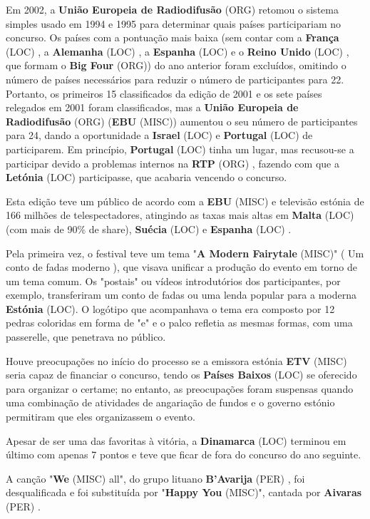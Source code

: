 \documentclass[12pt,a4paper]{article}
\begin{document}
Em 2002, a \textbf{União Europeia de Radiodifusão} (ORG) retomou o sistema simples usado em 1994 e 1995 para determinar quais países participariam no concurso. Os países com a pontuação mais baixa (sem contar com a \textbf{França} (LOC) , a \textbf{Alemanha} (LOC) , a \textbf{Espanha} (LOC) e o \textbf{Reino Unido} (LOC) , que formam o \textbf{Big Four} (ORG)) do ano anterior foram excluídos, omitindo o número de países necessários para reduzir o número de participantes para 22. Portanto, os primeiros 15 classificados da edição de 2001 e os sete países relegados em 2001 foram classificados, mas a \textbf{União Europeia de Radiodifusão} (ORG) (\textbf{EBU} (MISC)) aumentou o seu número de participantes para 24, dando a oportunidade a \textbf{Israel} (LOC) e \textbf{Portugal} (LOC) de participarem. Em princípio, \textbf{Portugal} (LOC) tinha um lugar, mas recusou-se a participar devido a problemas internos na \textbf{RTP} (ORG) , fazendo com que a \textbf{Letónia} (LOC) participasse, que acabaria vencendo o concurso.

Esta edição teve um público de acordo com a \textbf{EBU} (MISC) e televisão estónia de 166 milhões de telespectadores, atingindo as taxas mais altas em \textbf{Malta} (LOC) (com mais de 90\% de share), \textbf{Suécia} (LOC) e \textbf{Espanha} (LOC) .

Pela primeira vez, o festival teve um tema "\textbf{A Modern Fairytale} (MISC)" ( Um conto de fadas moderno ), que visava unificar a produção do evento em torno de um tema comum. Os "postais" ou vídeos introdutórios dos participantes, por exemplo, transferiram um conto de fadas ou uma lenda popular para a moderna \textbf{Estónia} (LOC). O logótipo que acompanhava o tema era composto por 12 pedras coloridas em forma de "e" e o palco refletia as mesmas formas, com uma passerelle, que penetrava no público.

Houve preocupações no início do processo se a emissora estónia \textbf{ETV} (MISC) seria capaz de financiar o concurso, tendo os \textbf{Países Baixos} (LOC) se oferecido para organizar o certame; no entanto, as preocupações foram suspensas quando uma combinação de atividades de angariação de fundos e o governo estónio permitiram que eles organizassem o evento.

Apesar de ser uma das favoritas à vitória, a \textbf{Dinamarca} (LOC) terminou em último com apenas 7 pontos e teve que ficar de fora do concurso do ano seguinte.

A canção "\textbf{We} (MISC) all", do grupo lituano \textbf{B'Avarija} (PER) , foi desqualificada e foi substituída por "\textbf{Happy You} (MISC)", cantada por \textbf{Aivaras} (PER) .
\end{document}
